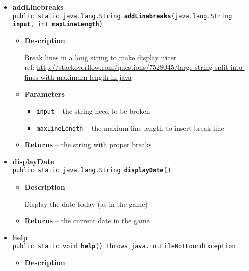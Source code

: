 {{{\begin{itemize}
{\begin{itemize}
{Break lines in a long string with maximum length of 80
}
\item{
{\bf  Parameters}
  \begin{itemize}
   \item{
\texttt{input} -- the string need to be broken}
  \end{itemize}
}%
\item{{\bf  Returns} -- 
the string with proper breaks 
}%
\end{itemize}
}%
\item{ 
{\bf  addLinebreaks}\\
\texttt{public static java.lang.String\ {\bf  addLinebreaks}(\texttt{java.lang.String} {\bf  input},
\texttt{int} {\bf  maxLineLength})
\label{personOfInterest.Game.addLinebreaks(java.lang.String, int)}}%
\begin{itemize}
\item{
{\bf  Description}

Break lines in a long string to make display nicer \\ref: \url{http://stackoverflow.com/questions/7528045/large-string-split-into- lines-with-maximum-length-in-java}
}
\item{
{\bf  Parameters}
  \begin{itemize}
   \item{
\texttt{input} -- the string need to be broken}
   \item{
\texttt{maxLineLength} -- the maxium line length to insert break line}
  \end{itemize}
}%
\item{{\bf  Returns} -- 
the string with proper breaks 
}%
\end{itemize}
}%
\item{ 
{\bf  displayDate}\\
\texttt{public static java.lang.String\ {\bf  displayDate}()
\label{personOfInterest.Game.displayDate()}}%
\begin{itemize}
\item{
{\bf  Description}

Display the date today (as in the game)
}
\item{{\bf  Returns} -- 
the current date in the game 
}%
\end{itemize}
}%
\item{ 
{\bf  help}\\
\texttt{public static void\ {\bf  help}() throws java.io.FileNotFoundException
\label{personOfInterest.Game.help()}}%
\begin{itemize}
\item{
{\bf  Description}

}
\end{itemize}}
\end{itemize}}}}
